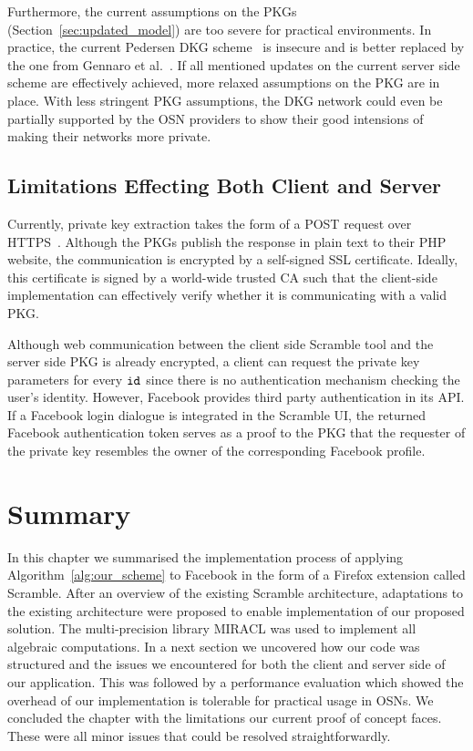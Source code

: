 Furthermore, the current assumptions on the PKGs (Section~\ref{sec:updated_model}) are too severe for practical environments. In practice, the current Pedersen DKG scheme~\cite{art:Pedersen91a} is insecure and is better replaced by the one from Gennaro et al.~\cite{art:GennaroJKR07}. If all mentioned updates on the current server side scheme are effectively achieved, more relaxed assumptions on the PKG are in place. With less stringent PKG assumptions, the DKG network could even be partially supported by the OSN providers to show their good intensions of making their networks more private.

\subsection{Limitations Effecting Both Client and Server}
Currently, private key extraction takes the form of a POST request over HTTPS~\cite{rfc2818}. Although the PKGs publish the response in plain text to their PHP website, the communication is encrypted by a self-signed SSL certificate. Ideally, this certificate is signed by a world-wide trusted CA such that the client-side implementation can effectively verify whether it is communicating with a valid PKG.

Although web communication between the client side Scramble tool and the server side PKG is already encrypted, a client can request the private key parameters for every $\mathtt{id}_{}$ since there is no authentication mechanism checking the user's identity. However, Facebook provides third party authentication in its API. If a Facebook login dialogue is integrated in the Scramble UI, the returned Facebook authentication token serves as a proof to the PKG that the requester of the private key resembles the owner of the corresponding Facebook profile.

\section{Summary}
In this chapter we summarised the implementation process of applying Algorithm~\ref{alg:our_scheme} to Facebook in the form of a Firefox extension called Scramble. After an overview of the existing Scramble architecture, adaptations to the existing architecture were proposed to enable implementation of our proposed solution. The multi-precision library MIRACL was used to implement all algebraic computations. In a next section we uncovered how our code was structured and the issues we encountered for both the client and server side of our application. This was followed by a performance evaluation which showed the overhead of our implementation is tolerable for practical usage in OSNs. We concluded the chapter with the limitations our current proof of concept faces. These were all minor issues that could be resolved straightforwardly.


